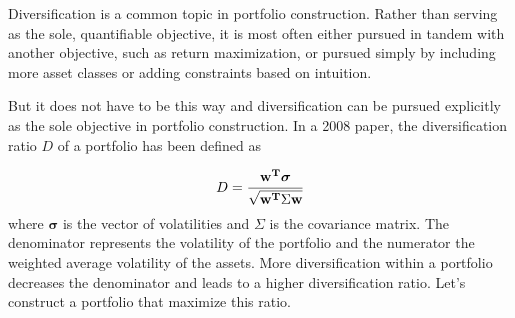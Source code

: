 Diversification is a common topic in portfolio construction. Rather than serving as the sole, quantifiable objective, it is most often either pursued in tandem with another objective, such as return maximization, or pursued simply by including more asset classes or adding constraints based on intuition.

But it does not have to be this way and diversification can be pursued explicitly as the sole objective in portfolio construction.
In a 2008 paper, the diversification ratio $D$ of a portfolio has been defined as

\[
D=\cfrac{\mathbf{w^T}\boldsymbol{\sigma}}{\sqrt {\mathbf{w^T}\Sigma \mathbf{w}}} 
\]
where $\boldsymbol{\sigma}$ is the vector of volatilities and $\Sigma$ is the covariance matrix. The denominator represents the volatility of the portfolio and the numerator the weighted average volatility of the assets. More diversification within a portfolio decreases the denominator and leads to a higher diversification ratio.
Let's construct a portfolio that maximize this ratio.


